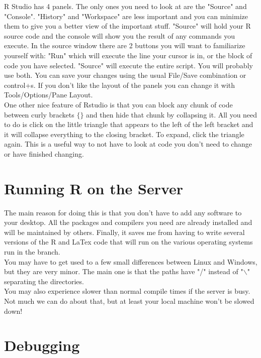\documentclass[]{report}
\begin{document}
R Studio has 4 panels.  The only ones you need to look at are the "Source" and "Console".  "History" and "Workspace" are less important and you can minimize them to give you a better view of the important stuff.  "Source" will hold your R source code and the console will show you the result of any commands you execute.  In the source window there are 2 buttons you will want to familiarize yourself with: "Run" which will execute the line your cursor is in, or the block of code you have selected.  "Source" will execute the entire script.  You will probably use both.  You can save your changes using the usual File/Save combination or control+s. If you don't like the layout of the panels you can change it with Tools/Options/Pane Layout. \\

One other nice feature of Rstudio is that you can block any chunk of code between curly brackets $\lbrace\rbrace$ and then hide that chunk by collapsing it.  All you need to do is click on the little triangle that appears to the left of the left bracket and it will collapse everything to the closing bracket.  To expand, click the triangle again.  This is a useful way to not have to look at code you don't need to change or have finished changing.   \\

\section*{Running R on the Server}
The main reason for doing this is that you don't have to add any software to your desktop.  All the packages and compilers you need are already installed and will be maintained by others.  Finally, it saves me from having to write several versions of the R and LaTex code that will run on the various operating systems run in the branch.  \\

You may have to get used to a few small differences between Linux and Windows, but they are very minor.  The main one is that the paths have "/" instead of "$\backslash$" separating the directories.  \\

You may also experience slower than normal compile times if the server is busy.  Not much we can do about that, but at least your local machine won't be slowed down! \\

\section*{Debugging}
\end{document}
